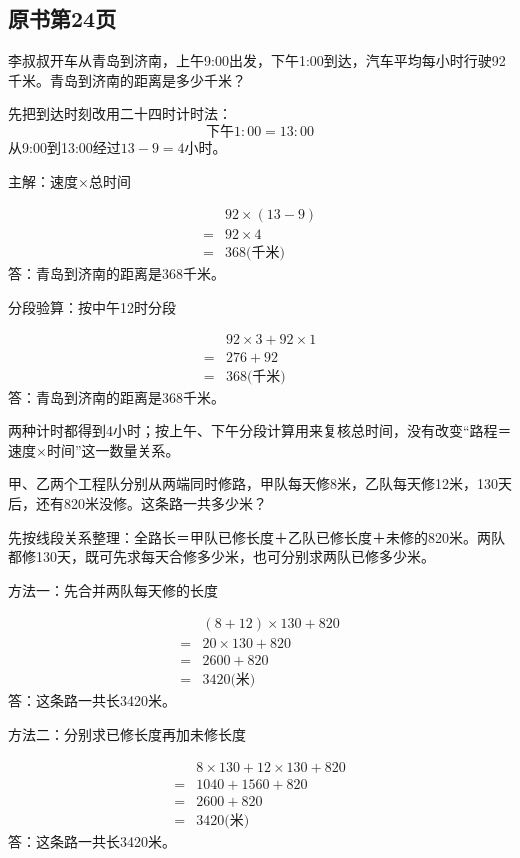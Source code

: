 

\subsection*{原书第24页}

李叔叔开车从青岛到济南，上午9:00出发，下午1:00到达，汽车平均每小时行驶92千米。青岛到济南的距离是多少千米？\par
\begin{BookAnswer}
先把到达时刻改用二十四时计时法：\[\text{下午}1{:}00=13{:}00\]从9:00到13:00经过\(13-9=4\)小时。\par 主解：速度×总时间\par \[\begin{aligned} &92\times(13-9)\\={}&92\times4\\={}&368\text{(千米)}\end{aligned}\]答：青岛到济南的距离是368千米。\par 分段验算：按中午12时分段\par \[\begin{aligned} &92\times3+92\times1\\={}&276+92\\={}&368\text{(千米)}\end{aligned}\]答：青岛到济南的距离是368千米。\par 两种计时都得到4小时；按上午、下午分段计算用来复核总时间，没有改变“路程＝速度×时间”这一数量关系。
\end{BookAnswer}

甲、乙两个工程队分别从两端同时修路，甲队每天修8米，乙队每天修12米，130天后，还有820米没修。这条路一共多少米？\par
\begin{BookAnswer}
先按线段关系整理：全路长＝甲队已修长度＋乙队已修长度＋未修的820米。两队都修130天，既可先求每天合修多少米，也可分别求两队已修多少米。\par 方法一：先合并两队每天修的长度\par \[\begin{aligned} &(8+12)\times130+820\\={}&20\times130+820\\={}&2600+820\\={}&3420\text{(米)}\end{aligned}\]答：这条路一共长3420米。\par 方法二：分别求已修长度再加未修长度\par \[\begin{aligned} &8\times130+12\times130+820\\={}&1040+1560+820\\={}&2600+820\\={}&3420\text{(米)}\end{aligned}\]答：这条路一共长3420米。\par
\end{BookAnswer}

